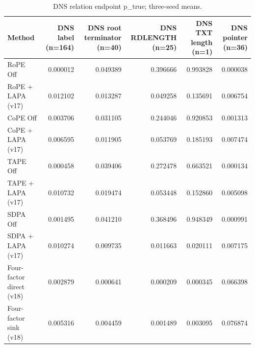 \begin{table}[t]
\centering
\scriptsize
\caption{DNS relation endpoint p\_true; three-seed means.}
\begin{tabular}{lrrrrr}
\toprule
Method & DNS label (n=164) & DNS root terminator (n=40) & DNS RDLENGTH (n=25) & DNS TXT length (n=1) & DNS pointer (n=36) \\
\midrule
RoPE Off & 0.000012 & 0.049389 & 0.396666 & 0.993828 & 0.000038 \\
RoPE + LAPA (v17) & 0.012102 & 0.013287 & 0.049258 & 0.135691 & 0.006754 \\
CoPE Off & 0.003706 & 0.031105 & 0.244046 & 0.920853 & 0.001313 \\
CoPE + LAPA (v17) & 0.006595 & 0.011905 & 0.053769 & 0.185193 & 0.007474 \\
TAPE Off & 0.000458 & 0.039406 & 0.272478 & 0.663521 & 0.000134 \\
TAPE + LAPA (v17) & 0.010732 & 0.019474 & 0.053448 & 0.152860 & 0.005098 \\
SDPA Off & 0.001495 & 0.041210 & 0.368496 & 0.948349 & 0.000991 \\
SDPA + LAPA (v17) & 0.010274 & 0.009735 & 0.011663 & 0.020111 & 0.007175 \\
Four-factor direct (v18) & 0.002879 & 0.000641 & 0.000209 & 0.000345 & 0.066398 \\
Four-factor sink (v18) & 0.005316 & 0.004459 & 0.001489 & 0.003095 & 0.076874 \\
\bottomrule
\end{tabular}
\end{table}
